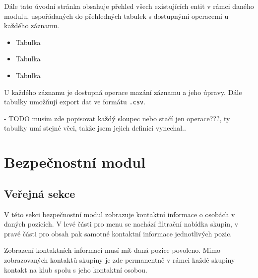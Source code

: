 \documentclass[11pt,oneside]{fithesis}
\begin{document}
            Dále tato úvodní stránka obsahuje přehled všech existujících entit v rámci daného modulu, uspořádaných do přehledných tabulek s dostupnými operacemi u každého záznamu.

            \begin{itemize}
                \item Tabulka 
                \item Tabulka 
                \item Tabulka 
            \end{itemize}

            U každého záznamu je dostupná operace mazání záznamu a jeho úpravy. Dále tabulky umožňují export dat ve formátu \verb|.csv|.

            - TODO musím zde popisovat každý sloupec nebo stačí jen operace???, ty tabulky umí stejné věci, takže jsem jejich definici vynechal..




        \section{Bezpečnostní modul}

            \subsection*{Veřejná sekce}
            V této sekci bezpečnostní modul zobrazuje kontaktní informace o osobách v daných pozicích. V levé části pro menu se nachází filtrační nabídka skupin, v pravé části pro obsah pak samotné kontaktní informace jednotlivých pozic.

            Zobrazení kontaktních informací musí mít daná pozice povoleno. 
            Mimo zobrazovaných kontaktů skupiny je zde permanentně v rámci každé skupiny kontakt na klub spolu s jeho kontaktní osobou.
\end{document}

